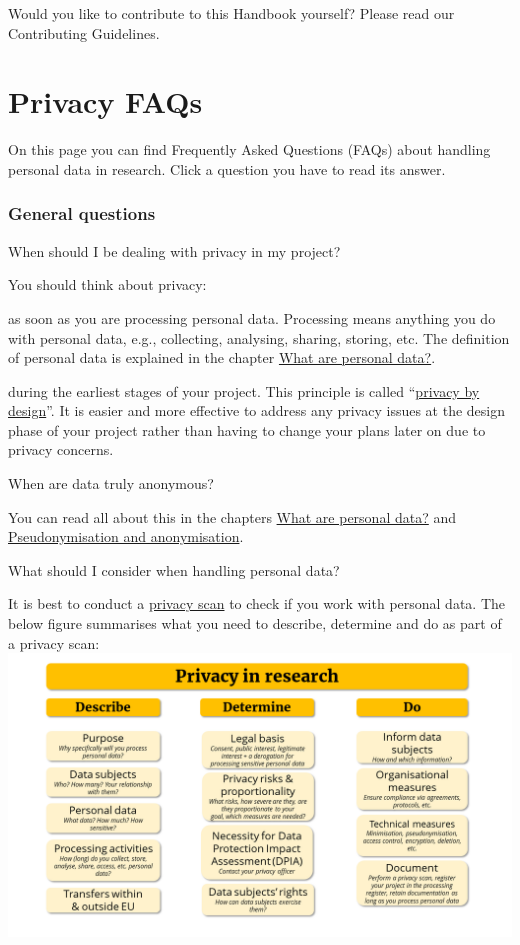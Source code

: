 \documentclass[
]{book}
\begin{document}
Would you like to contribute to this Handbook yourself? Please read our
Contributing Guidelines.

\hypertarget{faq}{%
\chapter{Privacy FAQs}\label{faq}}

On this page you can find Frequently Asked Questions (FAQs) about handling
personal data in research. Click a question you have to read its answer.

\hypertarget{general}{%
\subsection{General questions}\label{general}}

When should I be dealing with privacy in my project?

You should think about privacy:

as soon as you are processing personal data. Processing means anything you do with personal data, e.g., collecting, analysing, sharing, storing, etc. The definition of personal data is explained in the chapter \protect\hyperlink{personal-data}{What are personal data?}.

during the earliest stages of your project. This principle is called ``\protect\hyperlink{privacy-by-design}{privacy by design}''. It is easier and more effective to address any privacy issues at the design phase of your project rather than having to change your plans later on due to privacy concerns.

When are data truly anonymous?

You can read all about this in the chapters \protect\hyperlink{personal-data}{What are personal data?} and \protect\hyperlink{pseudonymisation-anonymisation}{Pseudonymisation and anonymisation}.

What should I consider when handling personal data?

It is best to conduct a \protect\hyperlink{privacy-scan}{privacy scan} to check if you work with personal data. The below figure summarises what you need to describe, determine and do as part of a privacy scan: \includegraphics{img/privacyscan_infograph.png}
\end{document}
